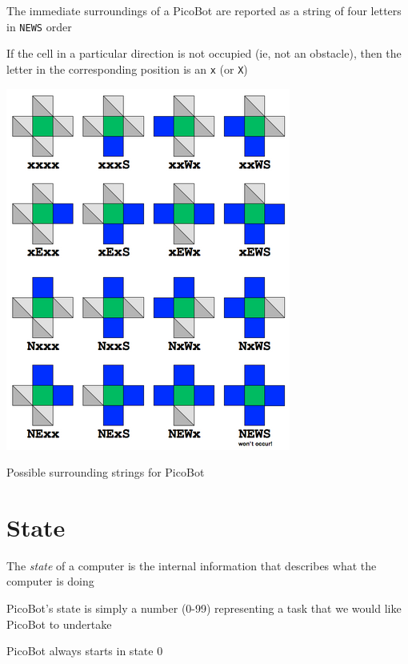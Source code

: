 \documentclass[8pt,a4paper,compress]{beamer}
\begin{document}
\begin{frame}[fragile]
\begin{minipage}{200pt}
The immediate surroundings of a PicoBot are reported as a string of four letters in \lstinline{NEWS} order


\bigskip

If the cell in a particular direction is not occupied (ie, not an obstacle), then the letter in the corresponding position is an \lstinline{x} (or \lstinline{X})
\end{minipage}\hfill%
\begin{minipage}{100pt}
\begin{center}
\includegraphics[scale=0.25]{figures/picobot_surroundings.png}

\smallskip

\tiny Possible surrounding strings for PicoBot
\end{center}
\end{minipage}
\end{frame}

\section{State}
\begin{frame}[fragile]
The \emph{state} of a computer is the internal information that describes what the computer is doing

\bigskip

PicoBot's state is simply a number (0-99) representing a task that we would like PicoBot to undertake

\bigskip

PicoBot always starts in state 0
\end{frame}
\end{document}
